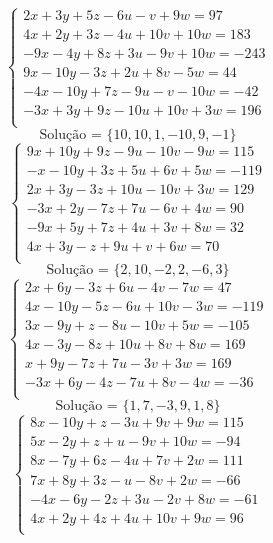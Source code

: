 \documentclass[12pt,oneside,a4paper]{article}
\begin{document}
\vspace{\baselineskip}
\begin{equation*}
\begin{cases}
2x+3y+5z-6u-v+9w=97 \\
4x+2y+3z-4u+10v+10w=183 \\
-9x-4y+8z+3u-9v+10w=-243 \\
9x-10y-3z+2u+8v-5w=44 \\
-4x-10y+7z-9u-v-10w=-42 \\
-3x+3y+9z-10u+10v+3w=196 \\
\end{cases}
\end{equation*}
\begin{equation*}
\text{Solução = }\{10,10,1,-10,9,-1\}
\end{equation*}
\vspace{\baselineskip}
\begin{equation*}
\begin{cases}
9x+10y+9z-9u-10v-9w=115 \\
-x-10y+3z+5u+6v+5w=-119 \\
2x+3y-3z+10u-10v+3w=129 \\
-3x+2y-7z+7u-6v+4w=90 \\
-9x+5y+7z+4u+3v+8w=32 \\
4x+3y-z+9u+v+6w=70 \\
\end{cases}
\end{equation*}
\begin{equation*}
\text{Solução = }\{2,10,-2,2,-6,3\}
\end{equation*}
\vspace{\baselineskip}
\begin{equation*}
\begin{cases}
2x+6y-3z+6u-4v-7w=47 \\
4x-10y-5z-6u+10v-3w=-119 \\
3x-9y+z-8u-10v+5w=-105 \\
4x-3y-8z+10u+8v+8w=169 \\
x+9y-7z+7u-3v+3w=169 \\
-3x+6y-4z-7u+8v-4w=-36 \\
\end{cases}
\end{equation*}
\begin{equation*}
\text{Solução = }\{1,7,-3,9,1,8\}
\end{equation*}
\vspace{\baselineskip}
\begin{equation*}
\begin{cases}
8x-10y+z-3u+9v+9w=115 \\
5x-2y+z+u-9v+10w=-94 \\
8x-7y+6z-4u+7v+2w=111 \\
7x+8y+3z-u-8v+2w=-66 \\
-4x-6y-2z+3u-2v+8w=-61 \\
4x+2y+4z+4u+10v+9w=96 \\
\end{cases}
\end{equation*}
\end{document}
